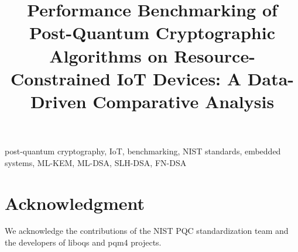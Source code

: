 \documentclass[conference]{IEEEtran}
\begin{document}
\title{Performance Benchmarking of Post-Quantum Cryptographic Algorithms on Resource-Constrained IoT Devices: A Data-Driven Comparative Analysis}

\author{
 \and
}

\maketitle



\begin{IEEEkeywords}
post-quantum cryptography, IoT, benchmarking, NIST standards, embedded systems, ML-KEM, ML-DSA, SLH-DSA, FN-DSA
\end{IEEEkeywords}


















\appendices




\section*{Acknowledgment}
We acknowledge the contributions of the NIST PQC standardization team and the developers of liboqs and pqm4 projects.

\clearpage

\nocite{*}

\end{document}
